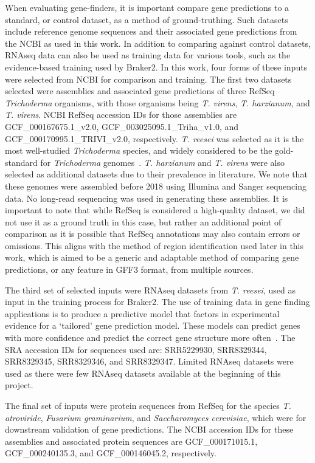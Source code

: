 When evaluating gene-finders, it is important compare gene predictions
to a standard, or control dataset, as a method of
ground-truthing. Such datasets include reference genome sequences and
their associated gene predictions from the NCBI as used in this work. In
addition to comparing against control datasets, RNAseq data can also
be used as training data for various tools, such as the
evidence-based training used by Braker2. In this work, four forms of
these inputs were selected from NCBI for comparison and training. The
first two datasets selected were assemblies and associated gene
predictions of three RefSeq \textit{Trichoderma} organisms, with
those organisms being \textit{T. virens}, \textit{T. harzianum}, and
\textit{T. virens}. NCBI RefSeq accession IDs for those assemblies are
GCF\_000167675.1\_v2.0, GCF\_003025095.1\_Triha\_v1.0, and
GCF\_000170995.1\_TRIVI\_v2.0, respectively. \textit{T. reesei} was
selected as it is the most well-studied \textit{Trichoderma} species,
and widely considered to be the gold-standard for \textit{Trichoderma}
genomes~\cite{gupta2016}. \textit{T. harzianum} and \textit{T. virens} were also selected as additional datasets due to their prevalence in literature. We note that these genomes were assembled before 2018 using Illumina and Sanger sequencing data. No long-read sequencing was used in generating these assemblies. It is important to note that while RefSeq is considered a high-quality
dataset, we did not use it as a ground truth in this case, but rather an additional point of comparison as it is possible that RefSeq annotations may also contain errors or omissions. This aligns with the method of region identification used later in this work, which is aimed to be a generic and adaptable method of comparing gene predictions, or any feature in GFF3 format, from multiple sources.

The third set of selected inputs were RNAseq datasets from
\textit{T. reesei}, used as input in the training process for
Braker2. The use of training data in gene finding applications is to
produce a predictive model that factors in experimental evidence for a
`tailored' gene prediction model. These models can predict genes with
more confidence and predict the correct gene structure more
often~\cite{liang2009}. The SRA accession IDs for sequences used are:
SRR5229930, SRR8329344, SRR8329345, SRR8329346, and
SRR8329347. Limited RNAseq datasets were used as there were few RNAseq
datasets available at the beginning of this project.

The final set of inputs were protein sequences from RefSeq for the species
\textit{T. atroviride}, \textit{Fusarium graminarium}, and
\textit{Saccharomyces cerevisiae}, which were for downstream
validation of gene predictions.  The NCBI accession IDs for these
assemblies and associated protein sequences are GCF\_000171015.1,
GCF\_000240135.3, and GCF\_000146045.2, respectively.


